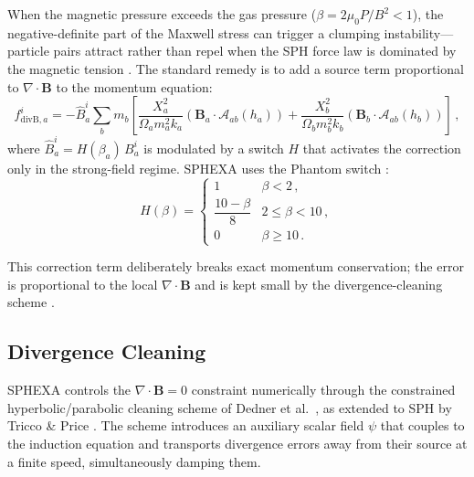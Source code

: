 When the magnetic pressure exceeds the gas pressure ($\beta = 2\mu_0 P / B^2 < 1$), the negative-definite part of the Maxwell stress can trigger a clumping instability---particle pairs attract rather than repel when the SPH force law is dominated by the magnetic tension \cite{Price2018}. The standard remedy \cite{Borve2001} is to add a source term proportional to $\nabla \cdot \mathbf{B}$ to the momentum equation:
\begin{equation}
    f^i_{\mathrm{divB},a} = -\hat{B}^i_a \sum_b m_b \left[\frac{X_a^2}{\Omega_a m_a^2 k_a}(\mathbf{B}_a \cdot \boldsymbol{\mathcal{A}}_{ab}(h_a)) + \frac{X_b^2}{\Omega_b m_b^2 k_b}(\mathbf{B}_b \cdot \boldsymbol{\mathcal{A}}_{ab}(h_b))\right]\,,
    \label{eq:fdivb}
\end{equation}
where $\hat{B}^i_a = H(\beta_a)\, B^i_a$ is modulated by a switch $H$ that activates the correction only in the strong-field regime. SPHEXA uses the Phantom switch \cite{Price2018}:
\begin{equation}
    H(\beta) = \begin{cases}
        1 & \beta < 2\,, \\[3pt]
        \dfrac{10 - \beta}{8} & 2 \leq \beta < 10\,, \\[6pt]
        0 & \beta \geq 10\,.
    \end{cases}
    \label{eq:beta_switch}
\end{equation}

This correction term deliberately breaks exact momentum conservation; the error is proportional to the local $\nabla \cdot \mathbf{B}$ and is kept small by the divergence-cleaning scheme \cite{Price2018}.



\subsection{Divergence Cleaning}
\label{sec:divb_cleaning}

SPHEXA controls the $\nabla \cdot \mathbf{B} = 0$ constraint numerically through the constrained hyperbolic/parabolic cleaning scheme of Dedner et al.\ \cite{Dedner2002}, as extended to SPH by Tricco \& Price \cite{TriccoPrice2012}. The scheme introduces an auxiliary scalar field $\psi$ that couples to the induction equation and transports divergence errors away from their source at a finite speed, simultaneously damping them.


